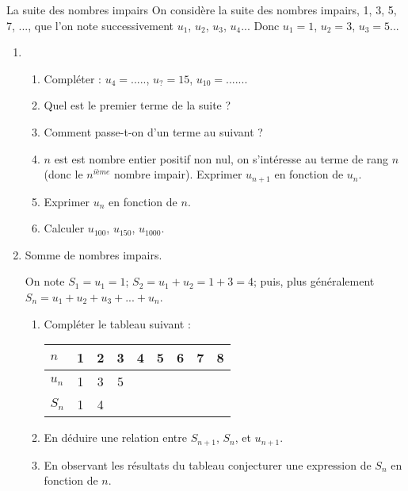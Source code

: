 \begin{myact}{La suite des nombres impairs}
	On considère la suite des nombres impairs, 1, 3, 5, 7, ..., que l'on note successivement $u_1$, $u_2$, $u_3$, $u_4$...
	Donc $u_1=1$, $u_2=3$, $u_3=5$...\\
	
	\begin{enumerate}[label=\arabic*)]
		\item \begin{enumerate}[label=\alph*.]
			\item Compléter : $u_4=.....$, $u_? =15$, $u_{10}=......$.
			\item Quel est le premier terme de la suite ?
			\item Comment passe-t-on d'un terme au suivant ?
			\item $n$ est est nombre entier positif non nul, on s'intéresse au terme de rang $n$ (donc le $n^{ième}$ nombre impair). Exprimer $u_{n+1}$ en fonction de $u_n$.
			\item Exprimer $u_n$ en fonction de $n$.
			\item Calculer $u_{100}$, $u_{150}$, $u_{1000}$.
		\end{enumerate} 
		
		\item Somme de nombres impairs. 
		
		On note $S_1=u_1=1$; $S_2=u_1+u_2=1+3=4$; puis, plus généralement $S_n=u_1+u_2+u_3+...+u_n$.
		
		\begin{enumerate}
			\item Compléter le tableau suivant :\\
			\begin{tabular}{|@{\ \ }l@{\ \ }|@{\ \ }c@{\ \ }|@{\ \ }c@{\ \ }|@{\ \ }c@{\ \ }|@{\ \ }c@{\ \ }|@{\ \ }c@{\ \ }|@{\ \ }c@{\ \ }|@{\ \ }c@{\ \ }|@{\ \ }c@{\ \ }|}
				\hline
				$n$   & 1 & 2 & 3 & 4 & 5 & 6 & 7 & 8 \\ \hline
				$u_n$ & 1 & 3 & 5 &   &   &   &   &   \\ \hline
				$S_n$ & 1 & 4 &   &   &   &   &   &   \\ \hline
			\end{tabular}
			
			\item En déduire une relation entre $S_{n+1}$, $S_{n}$, et $u_{n+1}$.
			
			\item En observant les résultats du tableau conjecturer une expression de $S_n$ en fonction de $n$.
		\end{enumerate}
	\end{enumerate}
	
	
\end{myact}